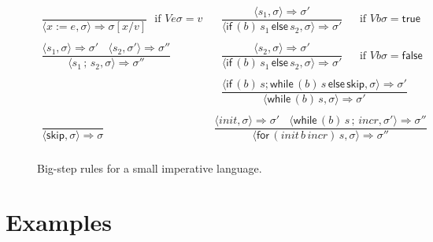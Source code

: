 \documentclass{llncs}
\newcommand{\true}{\mathsf {true}}
\newcommand{\false}{\mathsf {false}}
\newcommand{\keyword}[1]{\mathsf{#1}}
\newcommand{\SKIP}{\keyword{skip}}
\newcommand{\ASG}[2]{#1 := #2}
\newcommand{\SEQ}[2]{#1\,{;}\,#2}
\newcommand{\IFNZ}[3]{\keyword{if} \,(#1)\, #2\,\keyword{else}\,#3}
\newcommand{\FOR}[4]{\keyword{for} \,(#1\,#2\,#3)\, #4}
\newcommand{\WHILE}[2]{\keyword{while} \,(#1)\, #2}
\begin{document}
\begin{figure}
\[
\begin{array}{l|l}
 \dfrac{ } 
{\langle \ASG{x}{e}, \sigma \rangle \Longrightarrow \sigma[x/v]}
 ~~~\text{if } V e \sigma = v~


&~~~
\dfrac{\langle s_1, \sigma \rangle \Longrightarrow \sigma' } 
{\langle \IFNZ{b}{s_1}{s_2}, \sigma \rangle \Longrightarrow \sigma'}
 ~~~~~~~\text{if } V b \sigma = \true\\
 \\
\dfrac{\langle s_1, \sigma \rangle \Longrightarrow \sigma' ~~~~\langle s_2, \sigma' \rangle \Longrightarrow \sigma''} 
{\langle \SEQ{s_1}{s_2}, \sigma \rangle \Longrightarrow \sigma''}~~~
&~~~
\dfrac{\langle s_2, \sigma \rangle \Longrightarrow \sigma' } 
{\langle \IFNZ{b}{s_1}{s_2}, \sigma \rangle \Longrightarrow \sigma'}
 ~~~~~~~\text{if } V b \sigma = \false\\
 \\
 
 ~
&~~~
\dfrac{\langle \IFNZ{b}{s;\WHILE{b}{s}}{\SKIP}, \sigma \rangle \Longrightarrow \sigma'} 
{\langle \WHILE{b}{s}, \sigma \rangle \Longrightarrow \sigma'}
\\
\\
\dfrac{} 
{\langle \SKIP, \sigma \rangle \Longrightarrow \sigma}
 ~
&
\dfrac{\langle \mathit{init}, \sigma \rangle \Longrightarrow \sigma' ~~~~\langle \WHILE{b}{\SEQ{s}{\mathit{incr}}}, \sigma' \rangle \Longrightarrow \sigma''} 
{\langle \FOR{\mathit{init}}{b}{\mathit{incr}}{s}, \sigma \rangle \Longrightarrow \sigma''}
\\
 \end{array}
\]
\caption{Big-step rules for a small imperative language.}\label{big-step-trans}
\end{figure}

\section{Examples}\label{examples}
\end{document}
